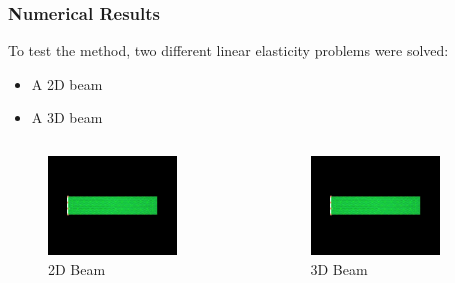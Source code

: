 \documentclass{beamer}
\begin{document}
\begin{frame}
    \frametitle{Numerical Results}
    To test the method, two different linear elasticity problems were solved:
    \begin{itemize}
        \item A 2D beam
        \item A 3D beam
    \end{itemize}
    \begin{columns}
        \begin{figure}
            \centering
            \includegraphics[width=0.8\textwidth]{Images/2D_beam.png}
            \caption{2D Beam}
        \end{figure}
        \begin{figure}
            \centering
            \includegraphics[width=0.8\textwidth]{Images/2D_beam.png}
            \caption{3D Beam}
        \end{figure}
    \end{columns}
\end{frame}
\end{document}
